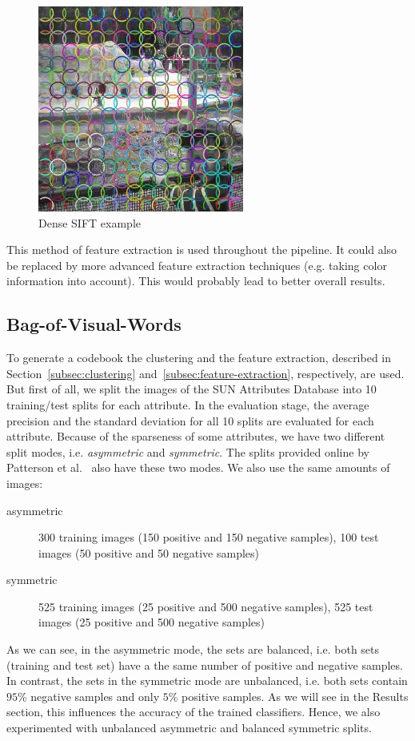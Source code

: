 \documentclass{vldb}
\begin{document}
\begin{figure}
  \centering
  \includegraphics[width = .25\textwidth]{figs/dense_sift.jpg}
  \caption{Dense SIFT example}
  \label{fig:dense-sift-example}
\end{figure}

This method of feature extraction is used throughout the pipeline. It could also
be replaced by more advanced feature extraction techniques (e.g. taking color
information into account). This would probably lead to better overall results.

\subsection{Bag-of-Visual-Words}
\label{subsec:bovw}

To generate a codebook the clustering and the feature extraction, described in
Section~\ref{subsec:clustering} and~\ref{subsec:feature-extraction}, respectively,
are used.
But first of all, we split the images of the SUN Attributes Database into 10
training/test splits for each attribute. In the evaluation stage, the average
precision and the standard deviation for all 10 splits are evaluated for each
attribute. Because of the sparseness of some attributes, we have two different
split modes, i.e. \emph{asymmetric} and \emph{symmetric}. The splits provided
online by Patterson et al.~\cite{Patterson:2012} also have these two modes.
We also use the same amounts of images:
\begin{description}
  \item[asymmetric] 300 training images (150 positive and 150 negative samples),
    100 test images (50 positive and 50 negative samples)
  \item[symmetric] 525 training images (25 positive and 500 negative samples),
    525 test images (25 positive and 500 negative samples)
\end{description}

As we can see, in the asymmetric mode, the sets are balanced, i.e. both sets
(training and test set) have a the same number of positive and negative samples.
In contrast, the sets in the symmetric mode are unbalanced, i.e. both sets contain
$95$\% negative samples and only $5$\% positive samples. As we will see in the
Results section, this influences the accuracy of the trained classifiers. Hence,
we also experimented with unbalanced asymmetric and balanced symmetric splits.
\end{document}
